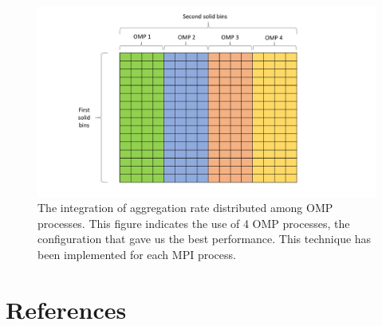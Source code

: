 \documentclass[preprint,11pt,authoryear]{elsarticle}
\begin{document}
\begin{figure}[H]
\centering
\includegraphics[scale=0.5]{OMP_table.pdf}
\caption{The integration of aggregation rate distributed among OMP processes. This figure indicates the use of 4 OMP processes, the 
configuration that gave us the best performance. This technique has been implemented for each MPI process.}
\label{fig:app_OMP_distribution}
\end{figure}	

\section*{References} 


\end{document}
